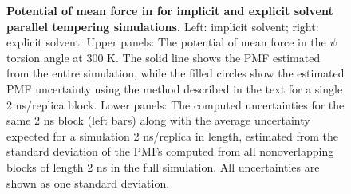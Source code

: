 \begin{figure}[tb]
  \begin{center}
  \end{center}
  \caption{{\bf Potential of mean force in \mbox{\boldmath{$\psi$}} for implicit and explicit solvent parallel tempering simulations.}  Left: implicit solvent; right: explicit solvent. Upper panels: The potential of mean force in the $\psi$ torsion angle at 300 K.  The solid line shows the PMF estimated from the entire simulation, while the filled circles show the estimated PMF uncertainty using the method described in the text for a single 2 ns/replica block.  Lower panels: The computed uncertainties for the same 2 ns block (left bars) along with the average uncertainty expected for a simulation 2 ns/replica in length, estimated from the standard deviation of the PMFs computed from all nonoverlapping blocks of length 2 ns in the full simulation.  All uncertainties are shown as one standard deviation.}
  \label{wham:figure:alanine-dipeptide-pmf}
\end{figure}

